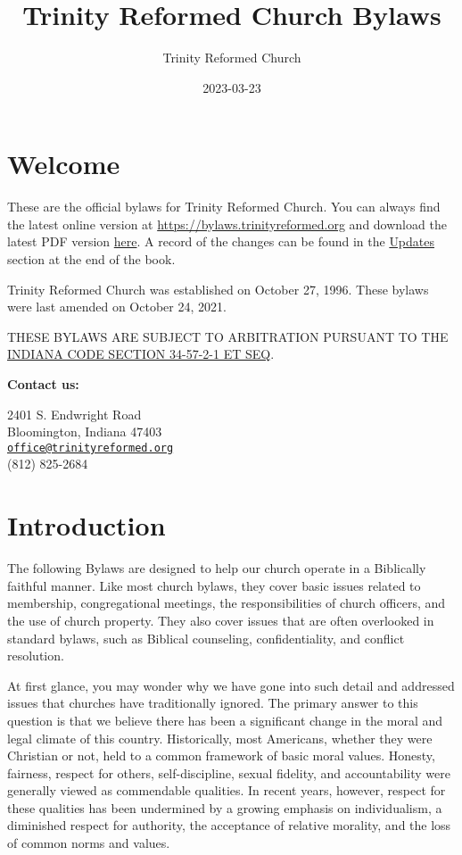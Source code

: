 \documentclass[
]{book}
\title{Trinity Reformed Church Bylaws}
\author{Trinity Reformed Church}
\date{2023-03-23}
\begin{document}
\maketitle

{
\hypersetup{linkcolor=}
\setcounter{tocdepth}{1}
\tableofcontents
}
\hypertarget{welcome}{%
\chapter*{Welcome}\label{welcome}}

These are the official bylaws for Trinity Reformed Church. You can always find the latest online version at \url{https://bylaws.trinityreformed.org} and download the latest PDF version \href{https://bylaws.trinityreformed.org/trc-bylaws.pdf}{here}. A record of the changes can be found in the \href{https://bylaws.trinityreformed.org/updates.html}{Updates} section at the end of the book.

Trinity Reformed Church was established on October 27, 1996. These bylaws were last amended on October 24, 2021.

THESE BYLAWS ARE SUBJECT TO ARBITRATION PURSUANT TO THE \href{https://iga.in.gov/legislative/laws/2022/ic/titles/034\#34-57-2-1}{INDIANA CODE SECTION 34-57-2-1 ET SEQ}.

\textbf{Contact us:}

2401 S. Endwright Road\\
Bloomington, Indiana 47403\\
\href{mailto:office@trinityreformed.org}{\nolinkurl{office@trinityreformed.org}}\\
(812) 825-2684

\mainmatter

\hypertarget{introduction}{%
\chapter{Introduction}\label{introduction}}

The following Bylaws are designed to help our church operate in a Biblically faithful manner. Like most church bylaws, they cover basic issues related to membership, congregational meetings, the responsibilities of church officers, and the use of church property. They also cover issues that are often overlooked in standard bylaws, such as Biblical counseling, confidentiality, and conflict resolution.

At first glance, you may wonder why we have gone into such detail and addressed issues that churches have traditionally ignored. The primary answer to this question is that we believe there has been a significant change in the moral and legal climate of this country. Historically, most Americans, whether they were Christian or not, held to a common framework of basic moral values. Honesty, fairness, respect for others, self-discipline, sexual fidelity, and accountability were generally viewed as commendable qualities. In recent years, however, respect for these qualities has been undermined by a growing emphasis on individualism, a diminished respect for authority, the acceptance of relative morality, and the loss of common norms and values.
\end{document}

